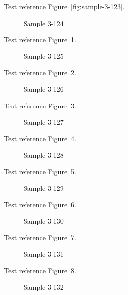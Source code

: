 Test reference Figure~\ref{fig:sample-3-123}.

\begin{figure}[tbhp]
\caption{Sample 3-124}
\label{fig:sample-3-124}
\end{figure}

Test reference Figure~\ref{fig:sample-3-124}.

\begin{figure}[tbhp]
\caption{Sample 3-125}
\label{fig:sample-3-125}
\end{figure}

Test reference Figure~\ref{fig:sample-3-125}.

\begin{figure}[tbhp]
\caption{Sample 3-126}
\label{fig:sample-3-126}
\end{figure}

Test reference Figure~\ref{fig:sample-3-126}.

\begin{figure}[tbhp]
\caption{Sample 3-127}
\label{fig:sample-3-127}
\end{figure}

Test reference Figure~\ref{fig:sample-3-127}.

\begin{figure}[tbhp]
\caption{Sample 3-128}
\label{fig:sample-3-128}
\end{figure}

Test reference Figure~\ref{fig:sample-3-128}.

\begin{figure}[tbhp]
\caption{Sample 3-129}
\label{fig:sample-3-129}
\end{figure}

Test reference Figure~\ref{fig:sample-3-129}.

\begin{figure}[tbhp]
\caption{Sample 3-130}
\label{fig:sample-3-130}
\end{figure}

Test reference Figure~\ref{fig:sample-3-130}.

\begin{figure}[tbhp]
\caption{Sample 3-131}
\label{fig:sample-3-131}
\end{figure}

Test reference Figure~\ref{fig:sample-3-131}.

\begin{figure}[tbhp]
\caption{Sample 3-132}
\label{fig:sample-3-132}
\end{figure}


